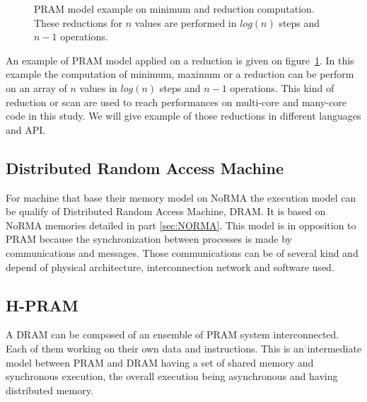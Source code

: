 \begin{figure}[t!]
{
}
\caption[PRAM model example]{PRAM model example on minimum and reduction computation. These reductions for $n$ values are performed in $log(n)$ steps and $n-1$ operations. }
\label{fig:pram_reduction}
\end{figure}

An example of PRAM model applied on a reduction is given on figure~\ref{fig:pram_reduction}.
In this example the computation of minimum, maximum or a reduction can be perform on an array of $n$ values in $log(n)$ steps and $n-1$ operations.
This kind of reduction or scan are used to reach performances on multi-core and many-core code in this study.
We will give example of those reductions in different languages and API. 

\subsection{Distributed Random Access Machine}
For machine that base their memory model on NoRMA the execution model can be qualify of Distributed Random Access Machine, DRAM.
It is based on NoRMA memories detailed in part \ref{sec:NORMA}.
This model is in opposition to PRAM because the synchronization between processes is made by communications and messages. 
Those communications can be of several kind and depend of physical architecture, interconnection network and software used.

\subsection{H-PRAM}
A DRAM can be composed of an ensemble of PRAM system interconnected. 
Each of them working on their own data and instructions. 
This is an intermediate model between PRAM and DRAM having a set of shared memory and synchronous execution, the overall execution being asynchronous and having distributed memory.

